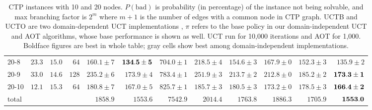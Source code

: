 \documentclass[letterpaper]{article}
\newcommand{\G}{\cellcolor[gray]{0.75}}
\begin{document}
\begin{table}[t]
{\begin{minipage}{7.3in}
\begin{tabular}{l@{}rr@{}r rr rrr rrr}
      20-8  & $23.3$ & $15.0$ & $64$ &    $160.1\pm7$ &$\bf 134.5\pm5$ &    $704.0\pm1$ &    $218.5\pm4$ &    $154.6\pm3$ &    $167.9\pm0$ &    $152.3\pm3$ &\G  $135.9\pm2$ \\
      20-9  & $33.0$ & $14.6$ & $128$&    $235.2\pm6$ &    $173.9\pm4$ &    $783.4\pm1$ &    $251.9\pm3$ &    $213.7\pm2$ &    $212.8\pm0$ &    $185.2\pm2$ &\G$\bf173.3\pm1$\\
      20-10 & $12.1$ & $15.3$ & $64$ &    $180.8\pm7$ &    $167.0\pm5$ &    $825.7\pm1$ &    $185.7\pm3$ &    $180.5\pm3$ &    $173.2\pm0$ &    $178.5\pm3$ &\G$\bf166.4\pm2$\\
      total &        &      &        &       $1858.9$ &       $1553.6$ &       $7542.9$ &       $2014.4$ &       $1763.8$ &       $1886.3$ &       $1705.9$ &\G$\bf  1553.0$ \\
      \bottomrule
    \end{tabular}
  \end{minipage}
}
\caption{\small  CTP instances with 10 and 20 nodes. $P(\text{bad})$ is probability (in percentage) of
  the instance not being solvable,
  and max branching factor is $2^m$ where $m+1$ is the number of edges with a common node in CTP graph.
  UCTB and UCTO are  two domain-dependent UCT implementations \cite{malte:ctp}, $\pi$ refers to the base
  policy in our domain-independent UCT and  AOT algorithms, whose  base performance is shown as well.
  UCT run for 10,000 iterations and AOT for 1,000. Boldface figures are best in whole table; gray cells show
  best among domain-independent implementations.}
\label{table:results:ctp}
\end{table}
\end{document}
